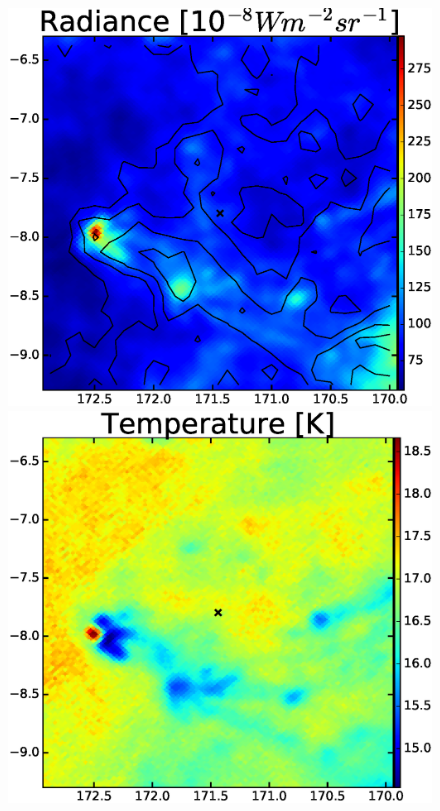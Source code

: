 \documentclass[preprint]{emulateapj}
\begin{document}
\begin{figure}[h!]
\includegraphics[scale=0.21]{fig/src_eg_apd0_r0c2.eps}
\includegraphics[scale=0.21]{fig/src_eg_apd0_r0c3.eps}
%


\end{figure}
\end{document}
